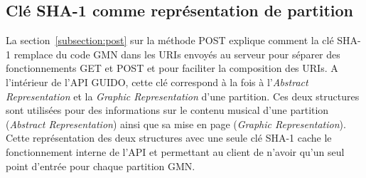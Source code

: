 \documentclass{article}
\begin{document}
\subsection{Clé SHA-1 comme représentation de partition}
La section~\ref{subsection:post} sur la méthode POST explique comment la clé SHA-1 remplace du code GMN dans les URIs envoyés au serveur pour séparer des fonctionnements GET et POST et pour faciliter la composition des URIs. A l'intérieur de l'API GUIDO, cette clé correspond à la fois à l'\emph{Abstract Representation} et la \emph{Graphic Representation} d'une partition. Ces deux structures sont utilisées pour des informations sur le contenu musical d'une partition (\emph{Abstract Representation}) ainsi que sa mise en page (\emph{Graphic Representation}). Cette représentation des deux structures avec une seule clé SHA-1 cache le fonctionnement interne de l'API et permettant au client de n'avoir qu'un seul point d'entrée pour chaque partition GMN.
\end{document}
